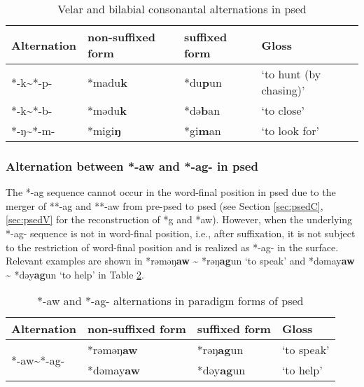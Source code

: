 \begin{table}[!htbp]
\centering
\caption{Velar and bilabial consonantal alternations in \acl{psed}}
\label{tab:psed_lab_vel}
\begin{tabular}{llll}
\hline
Alternation & non-suffixed form & suffixed form & Gloss                  \\ \hline
*-k\~{ }*-p-     & *madu\textbf{k}  & *du\textbf{p}un       & `to hunt (by chasing)' \\
*-k\~{ }*-b-     & *mədu\textbf{k}  & *də\textbf{b}an       & `to close'             \\
*-ŋ\~{ }*-m-     & *migi\textbf{ŋ}  & *gi\textbf{m}an       & `to look for'          \\ \hline
\end{tabular}
\end{table}

\subsubsection{Alternation between *-aw and *-ag- in \acl{psed}}

The *-ag sequence cannot occur in the word-final position in \acl{psed} due to the merger of **-ag and **-aw from pre-\acl{psed} to \acl{psed}  (see Section \ref{sec:psedC}, \ref{sec:psedV} for the reconstruction of *g and *aw). However, when the underlying *-ag- sequence is not in word-final position, i.e., after suffixation, it is not subject to the restriction of word-final position and is realized as *-ag- in the surface. Relevant examples are shown in *rəməŋ\textbf{aw} \~{} *rəŋ\textbf{ag}un `to speak' and  *dəmay\textbf{aw} \~{} *dəy\textbf{ag}un `to help' in Table \ref{tab:psed_agaw}.

\begin{table}[!htbp]
\centering
\caption{*-aw and *-ag- alternations in paradigm forms of \acl{psed}}
\label{tab:psed_agaw}
\begin{tabular}{llll}
\hline
Alternation                      & non-suffixed form  & suffixed form & Gloss                   \\ \hline
\multirow{2}{*}{*-aw\~{ }*-ag-}  & *rəməŋ\textbf{aw} & *rəŋ\textbf{ag}un     & `to speak'               \\
                                & *dəmay\textbf{aw} & *dəy\textbf{ag}un     & `to help' \\ \hline
\end{tabular}
\end{table}

